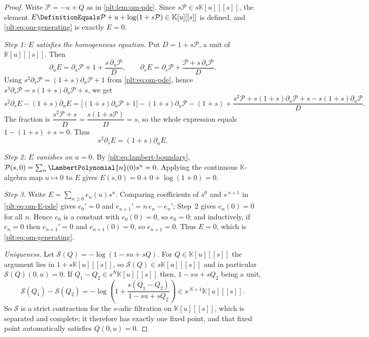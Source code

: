 \documentclass[11pt,oneside]{article}
\theoremstyle{plain}
\theoremstyle{definition}
\theoremstyle{remark}
\newcommand{\K}{\mathbb{K}}
\newcommand{\LamP}[1]{\LambertPolynomial{#1}}
\begin{document}
\begin{proof}
Write \(\mathcal P=-u+Q\) as in \cref{plt:lem:om-pde}.  Since
\(s\mathcal P\in s\K[u][[s]]\), the element
\(E\DefinitionEquals\mathcal P+u+\log(1+s\mathcal P)\in\K[u][[s]]\) is
defined, and \eqref{plt:eq:om-generating} is exactly \(E=0\).

\emph{Step 1: \(E\) satisfies the homogeneous equation.}  Put
\(D=1+s\mathcal P\), a unit of \(\K[u][[s]]\).  Then
\[
 \partial_uE=\partial_u\mathcal P+1+\frac{s\,\partial_u\mathcal P}{D},
 \qquad
 \partial_sE=\partial_s\mathcal P+\frac{\mathcal P+s\,\partial_s\mathcal P}{D}.
\]
Using \(s^{2}\partial_s\mathcal P=(1+s)\partial_u\mathcal P+1\) from
\eqref{plt:eq:om-pde}, hence
\(s^{3}\partial_s\mathcal P=s(1+s)\partial_u\mathcal P+s\), we get
\[
 s^{2}\partial_sE-(1+s)\partial_uE
 =\bigl[(1+s)\partial_u\mathcal P+1\bigr]-(1+s)\partial_u\mathcal P-(1+s)
  +\frac{s^{2}\mathcal P+s(1+s)\partial_u\mathcal P+s
        -s(1+s)\partial_u\mathcal P}{D}.
\]
The fraction is \(\dfrac{s^{2}\mathcal P+s}{D}=\dfrac{s(1+s\mathcal P)}{D}=s\),
so the whole expression equals \(1-(1+s)+s=0\).  Thus
\begin{equation}\label{plt:eq:om-E-pde}
 s^{2}\partial_sE=(1+s)\partial_uE .
\end{equation}

\emph{Step 2: \(E\) vanishes on \(u=0\).}  By
\eqref{plt:eq:lambert-boundary}, \(\mathcal P(s,0)=\sum_n\LamP{n}(0)s^{n}=0\).
Applying the continuous \(\K\)-algebra map \(u\mapsto0\) to \(E\) gives
\(E(s,0)=0+0+\log(1+0)=0\).

\emph{Step 3.}  Write \(E=\sum_{n\ge0}e_n(u)s^{n}\).  Comparing coefficients
of \(s^{0}\) and \(s^{\,n+1}\) in \eqref{plt:eq:om-E-pde} gives
\(e_0'=0\) and \(e_{n+1}'=n\,e_n-e_n'\); Step~2 gives \(e_n(0)=0\) for all
\(n\).  Hence \(e_0\) is a constant with \(e_0(0)=0\), so \(e_0=0\); and
inductively, if \(e_n=0\) then \(e_{n+1}'=0\) and \(e_{n+1}(0)=0\), so
\(e_{n+1}=0\).  Thus \(E=0\), which is \eqref{plt:eq:om-generating}.

\emph{Uniqueness.}  Let \(\mathcal S(Q)=-\log(1-su+sQ)\).  For
\(Q\in\K[u][[s]]\) the argument lies in \(1+s\K[u][[s]]\), so
\(\mathcal S(Q)\in s\K[u][[s]]\) and in particular \(\mathcal S(Q)(0,u)=0\).
If \(Q_1-Q_2\in s^{N}\K[u][[s]]\) then, \(1-su+sQ_2\) being a unit,
\[
 \mathcal S(Q_1)-\mathcal S(Q_2)
 =-\log\left(1+\frac{s(Q_1-Q_2)}{1-su+sQ_2}\right)\in s^{\,N+1}\K[u][[s]].
\]
So \(\mathcal S\) is a strict contraction for the \(s\)-adic filtration on
\(\K[u][[s]]\), which is separated and complete; it therefore has exactly one
fixed point, and that fixed point automatically satisfies \(Q(0,u)=0\).
\end{proof}
\end{document}

